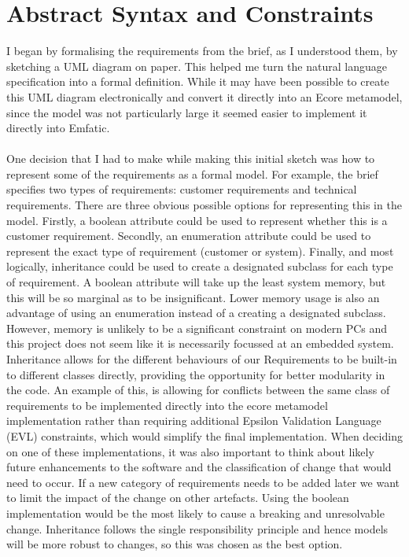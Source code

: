 \documentclass{article}
\begin{document}
\section{Abstract Syntax and Constraints}
\label{abstract_syntax}
I began by formalising the requirements from the brief, as I understood them, by sketching a UML diagram on paper. This helped me turn the natural language specification into a formal definition. While it may have been possible to create this UML diagram electronically and convert it directly into an Ecore metamodel, since the model was not particularly large it seemed easier to implement it directly into Emfatic.
\\\\
One decision that I had to make while making this initial sketch was how to represent some of the requirements as a formal model. For example, the brief specifies two types of requirements: customer requirements and technical requirements. There are three obvious possible options for representing this in the model. Firstly, a boolean attribute could be used to represent whether this is a customer requirement. Secondly, an enumeration attribute could be used to represent the exact type of requirement (customer or system). Finally, and most logically, inheritance could be used to create a designated subclass for each type of requirement. A boolean attribute will take up the least system memory, but this will be so marginal as to be insignificant. Lower memory usage is also an advantage of using an enumeration instead of a creating a designated subclass. However, memory is unlikely to be a significant constraint on modern PCs and this project does not seem like it is necessarily focussed at an embedded system. Inheritance allows for the different behaviours of our Requirements to be built-in to different classes directly, providing the opportunity for better modularity in the code. An example of this, is allowing for conflicts between the same class of requirements to be implemented directly into the ecore metamodel implementation rather than requiring additional Epsilon Validation Language (EVL) constraints, which would simplify the final implementation. When deciding on one of these implementations, it was also important to think about likely future enhancements to the software and the classification of change\cite{metamodel_sync} that would need to occur. If a new category of requirements needs to be added later we want to limit the impact of the change on other artefacts. Using the boolean implementation would be the most likely to cause a breaking and unresolvable change. Inheritance follows the single responsibility principle and hence models will be more robust to changes\cite[p.~95]{martin2002agile}, so this was chosen as the best option.
\end{document}

